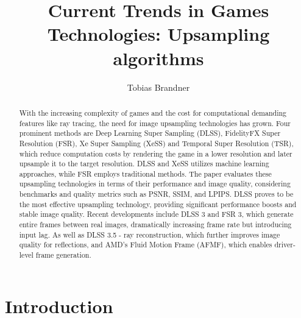 \documentclass[letterpaper, 10 pt, conference]{ieeeconf}  %
\title{\LARGE \bf
Current Trends in Games Technologies: Upsampling algorithms
}
\author{Tobias Brandner}
\affil{Julius-Maximilians University \\
        Würzburg, Germany \\
        tobias.brandner@stud-mail.uni-wuerzburg.de}
\begin{document}
\maketitle
\thispagestyle{empty}
\pagestyle{empty}

\BiblatexSplitbibDefernumbersWarningOff

\begin{abstract}

With the increasing complexity of games and the cost for computational demanding features like ray tracing, the need for image upsampling technologies has grown. 
Four prominent methods are Deep Learning Super Sampling (DLSS), FidelityFX Super Resolution (FSR), Xe Super Sampling (XeSS) and Temporal Super Resolution (TSR), which reduce computation costs by rendering the game in a lower resolution and later upsample it to the target resolution. 
DLSS and XeSS utilizes machine learning approaches, while FSR employs traditional methods. 
The paper evaluates these upsampling technologies in terms of their performance and image quality, considering benchmarks and quality metrics such as PSNR, SSIM, and LPIPS. 
DLSS proves to be the most effective upsampling technology, providing significant performance boosts and stable image quality. 
Recent developments include DLSS 3 and FSR 3, which generate entire frames between real images, dramatically increasing frame rate but introducing input lag.
As well as DLSS 3.5 - ray reconstruction, which further improves image quality for reflections, and AMD's Fluid Motion Frame (AFMF), which enables driver-level frame generation.
\end{abstract}


\section{Introduction}
\end{document}
